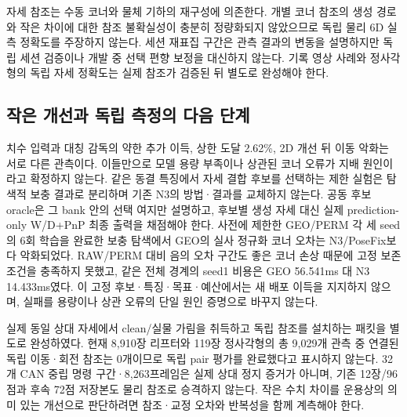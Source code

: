 자세 참조는 수동 코너와 물체 기하의 재구성에 의존한다. 개별 코너 참조의 생성 경로와 작은 차이에 대한 참조 불확실성이 충분히 정량화되지 않았으므로 독립 물리 6D 실측 정확도를 주장하지 않는다. 세션 재표집 구간은 관측 결과의 변동을 설명하지만 독립 세션 검증이나 개발 중 선택 편향 보정을 대신하지 않는다. 기록 영상 사례와 정사각형의 독립 자세 정확도는 실제 참조가 검증된 뒤 별도로 완성해야 한다.

\subsection{작은 개선과 독립 측정의 다음 단계}
치수 입력과 대칭 감독의 약한 추가 이득, 상한 도달 2.62\%, 2D 개선 뒤 이동 악화는 서로 다른 관측이다. 이들만으로 모델 용량 부족이나 상관된 코너 오류가 지배 원인이라고 확정하지 않는다. 같은 동결 특징에서 자세 결합 후보를 선택하는 제한 실험은 탐색적 보충 결과로 분리하며 기존 N3의 방법·결과를 교체하지 않는다. 공동 후보 oracle은 그 bank 안의 선택 여지만 설명하고, 후보별 생성 자세 대신 실제 prediction-only W/D+PnP 최종 출력을 채점해야 한다. 사전에 제한한 GEO/PERM 각 세 seed의 6회 학습을 완료한 보충 탐색에서 GEO의 실사 정규화 코너 오차는 N3/PoseFix보다 악화되었다. RAW/PERM 대비 음의 오차 구간도 좋은 코너 손상 때문에 고정 보존 조건을 충족하지 못했고, 같은 전체 경계의 seed1 비용은 GEO 56.541ms 대 N3 14.433ms였다. 이 고정 후보·특징·목표·예산에서는 새 배포 이득을 지지하지 않으며, 실패를 용량이나 상관 오류의 단일 원인 증명으로 바꾸지 않는다.

실제 동일 상대 자세에서 clean/실물 가림을 취득하고 독립 참조를 설치하는 패킷을 별도로 완성하였다. 현재 8,910장 리프터와 119장 정사각형의 총 9,029개 관측 중 연결된 독립 이동·회전 참조는 0개이므로 독립 pair 평가를 완료했다고 표시하지 않는다. 32개 CAN 중립 명령 구간·8,263프레임은 실제 상대 정지 증거가 아니며, 기존 12장/96점과 후속 72점 저장본도 물리 참조로 승격하지 않는다. 작은 수치 차이를 운용상의 의미 있는 개선으로 판단하려면 참조·교정 오차와 반복성을 함께 계측해야 한다.

